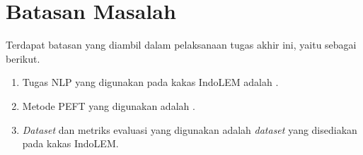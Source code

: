 \section{Batasan Masalah}
\label{sec:batasan-masalah}

Terdapat batasan yang diambil dalam pelaksanaan tugas akhir ini, yaitu sebagai berikut.

\begin{enumerate}
    \item Tugas NLP yang digunakan pada kakas IndoLEM adalah \nlptask.
    \item Metode PEFT yang digunakan adalah \methodPEFT.
    \item \textit{Dataset} dan metriks evaluasi yang digunakan adalah \textit{dataset} yang disediakan pada kakas IndoLEM.
\end{enumerate}
